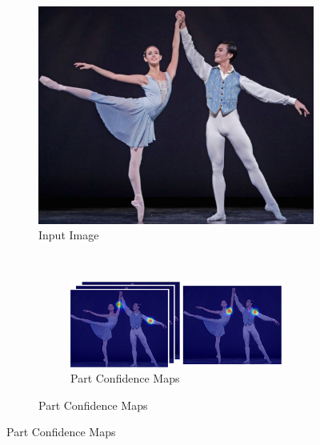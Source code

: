 \begin{figure}[h]
  \captionsetup[sub]{font=scriptsize,belowskip=2pt,aboveskip=3pt}
  \begin{subfigure}[t]{0.24\textwidth}
    \includegraphics[width=1\linewidth]{img/openpose_pipeline_a}
    \caption{Input Image}
    \label{fig:oppA}
  \end{subfigure}%
  ~
  \begin{subfigure}[b]{0.24\textwidth}
    \begin{subfigure}{1\textwidth}
      \includegraphics[width=1\linewidth]{img/openpose_pipeline_b}
      \caption{Part Confidence Maps}
      \label{fig:oppB}
    \end{subfigure}
    

\end{subfigure}
\end{figure}
